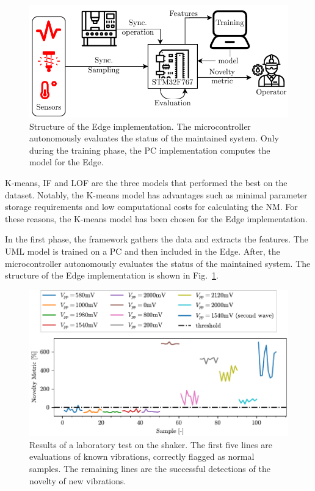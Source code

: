 \begin{figure}
    \includegraphics[width=\linewidth]{images/EmbeddedStructure.pdf}
    \caption{Structure of the Edge implementation. The microcontroller autonomously evaluates the status of the maintained system. Only during the training phase, the PC implementation computes the model for the Edge.}
    \label{fig:embedded}
\end{figure}

K-means, IF and LOF are the three models that performed the best on the dataset. Notably, the K-means model has advantages such as minimal parameter storage requirements and low computational costs for calculating the NM. For these reasons, the K-means model has been chosen for the Edge implementation.

In the first phase, the framework gathers the data and extracts the features. The UML model is trained on a PC and then included in the Edge. After, the microcontroller autonomously evaluates the status of the maintained system. The structure of the Edge implementation is shown in Fig.~\ref{fig:embedded}. 

\begin{figure}
    \includegraphics[width=\linewidth]{images/Test02_LOF.pdf}
    \caption{Results of a laboratory test on the shaker. The first five lines are evaluations of known vibrations, correctly flagged as normal samples. The remaining lines are the successful detections of the novelty of new vibrations.}
    \label{fig:shaker}
\end{figure}

